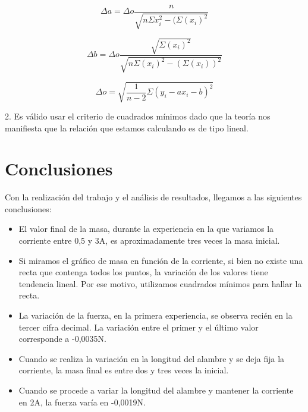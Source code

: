 \documentclass{article}
\begin{document}
\begin{equation}
\Delta a = \Delta o \frac{n}{\sqrt{n\Sigma x_{i}^{2} - (\Sigma (x_{i})^{2} }}
\end{equation}

\begin{equation}
\Delta b = \Delta o \frac{\sqrt{\Sigma (x_{i})^{2}}}{\sqrt{n\Sigma (x_{i})^{2} - (\Sigma (x_{i}))^{2} }}
\end{equation}

\begin{equation}
\Delta o = \sqrt{\frac{1}{n-2}\Sigma(y_{i} - a x_{i} - b)^{2}}
\end{equation}


2. Es válido usar el criterio de cuadrados mínimos dado que la teoría nos manifiesta que la relación que estamos calculando es de tipo lineal.


\section{Conclusiones}

Con la realización del trabajo y el análisis de resultados, llegamos a las siguientes conclusiones:
\begin{itemize}
\item El valor final de la masa, durante la experiencia en la que variamos la corriente entre 0,5 y 3A, es aproximadamente tres veces la masa inicial.
\item Si miramos el gráfico de masa en función de la corriente, si bien no existe una recta que contenga todos los puntos, la variación de los valores tiene tendencia lineal. Por ese motivo, utilizamos cuadrados mínimos para hallar la recta.
\item La variación de la fuerza, en la primera experiencia, se observa recién en la tercer cifra decimal. La variación entre el primer y el último valor corresponde a -0,0035N.
\item Cuando se realiza la variación en la longitud del alambre y se deja fija la corriente, la masa final es entre dos y tres veces la inicial.
\item Cuando se procede a variar la longitud del alambre y mantener la corriente en 2A, la fuerza varía en -0,0019N.

\end{itemize}
\end{document}

